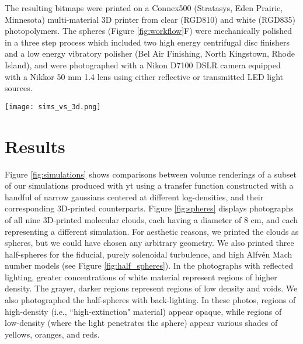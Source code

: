 \documentclass[twocolumn]{aastex63}
\begin{document}
The resulting bitmaps were printed on a Connex500 (Stratasys, Eden Prairie, Minnesota) multi-material 3D printer from clear (RGD810) and white (RGD835) photopolymers. The spheres (Figure \ref{fig:workflow}F) were mechanically polished in a three step process which included two high energy centrifugal disc finishers and a low energy vibratory polisher (Bel Air Finishing, North Kingstown, Rhode Island), and were photographed with a Nikon D7100 DSLR camera equipped with a Nikkor 50 mm 1.4 lens using either reflective or transmitted LED light sources.

\begin{figure*}[ht!]
    \centering
    \texttt{[image: sims\_vs\_3d.png]}
    \caption{Comparisons of 2D volume renderings of a subset of our simulations (upper row) and their corresponding 3D-printed counterparts (lower row).  The dotted circle in each case denotes the border of the cropped spherical volume.  From left to right, the fiducial model, purely solenoidal turbulence, and purely compressive turbulence. For scale, each 3D-printed sphere measures 8 cm in diameter.}
    \label{fig:simulations}
\end{figure*}

\section{Results}\label{sec:clouds}

Figure \ref{fig:simulations} shows comparisons between volume renderings of a subset of our simulations produced with yt \citep{Turk2011} using a transfer function constructed with a handful of narrow gaussians centered at different log-densities, and their corresponding 3D-printed counterparts.  Figure  \ref{fig:spheres} displays photographs of all nine 3D-printed molecular clouds, each having a diameter of 8 cm, and each representing a different simulation.  For aesthetic reasons, we printed the clouds as spheres, but we could have chosen any arbitrary geometry.  We also printed three half-spheres for the fiducial, purely solenoidal turbulence, and high Alfv\'en Mach number models (see Figure \ref{fig:half_spheres}).  In the photographs with reflected lighting, greater concentrations of white material represent regions of higher density.  The grayer, darker regions represent regions of low density and voids.  We also photographed the half-spheres with back-lighting.  In these photos, regions of high-density (i.e., ``high-extinction" material) appear opaque, while regions of low-density (where the light penetrates the sphere) appear various shades of yellows, oranges, and reds.
\end{document}
